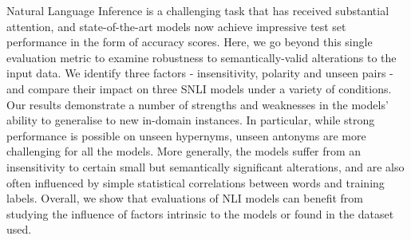 Natural Language Inference is a challenging task that has received substantial attention, and state-of-the-art models now achieve impressive test set performance in the form of accuracy scores. Here, we go beyond this single evaluation metric to examine robustness to semantically-valid alterations to the input data. We identify three factors - insensitivity, polarity and unseen pairs - and compare their impact on three SNLI models under a variety of conditions. Our results demonstrate a number of strengths and weaknesses in the models' ability to generalise to new in-domain instances. In particular, while strong performance is possible on unseen hypernyms, unseen antonyms are more challenging for all the models. More generally, the models suffer from an insensitivity to certain small but semantically significant alterations, and are also often influenced by simple statistical correlations between words and training labels. Overall, we show that evaluations of NLI models can benefit from studying the influence of factors intrinsic to the models or found in the dataset used.
